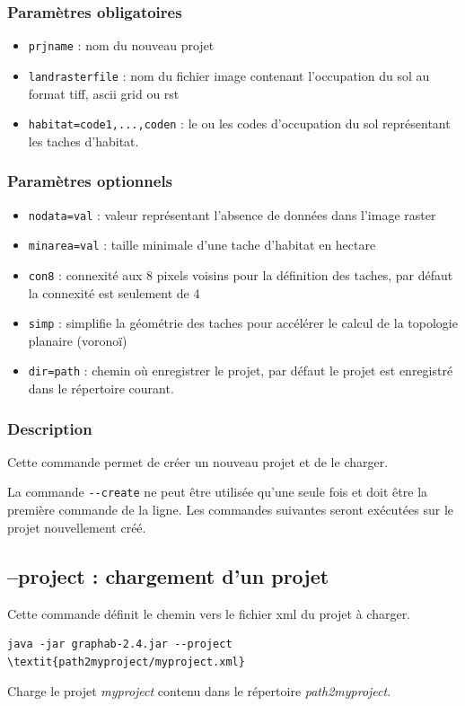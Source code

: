\documentclass[a4paper,10pt]{report}
\begin{document}
\subsubsection{Paramètres obligatoires}
\begin{itemize}
	\item \verb|prjname| : nom du nouveau projet
	\item \verb|landrasterfile| : nom du fichier image contenant l'occupation du sol au format tiff, ascii grid ou rst
	\item \verb|habitat=code1,...,coden| : le ou les codes d'occupation du sol représentant les taches d'habitat.
\end{itemize}

\subsubsection{Paramètres optionnels}
\begin{itemize}
	\item \verb|nodata=val| : valeur représentant l'absence de données dans l'image raster
	\item \verb|minarea=val| : taille minimale d'une tache d'habitat en hectare
	\item \verb|con8| : connexité aux 8 pixels voisins pour la définition des taches, par défaut la connexité est seulement de 4
	\item \verb|simp| : simplifie la géométrie des taches pour accélérer le calcul de la topologie planaire (voronoï)
	\item \verb|dir=path| : chemin où enregistrer le projet, par défaut le projet est enregistré dans le répertoire courant.
\end{itemize}

\subsubsection{Description}
Cette commande permet de créer un nouveau projet et de le charger.

La commande \verb|--create| ne peut être utilisée qu'une seule fois et doit être la première commande de la ligne.
Les commandes suivantes seront exécutées sur le projet nouvellement créé.

\subsection{--project : chargement d'un projet}
Cette commande définit le chemin vers le fichier xml du projet à charger.
\begin{Verbatim}[commandchars=\\\{\}]
	java -jar graphab-2.4.jar --project \textit{path2myproject/myproject.xml}
\end{Verbatim}
Charge le projet \textit{myproject} contenu dans le répertoire \textit{path2myproject}.
\end{document}
